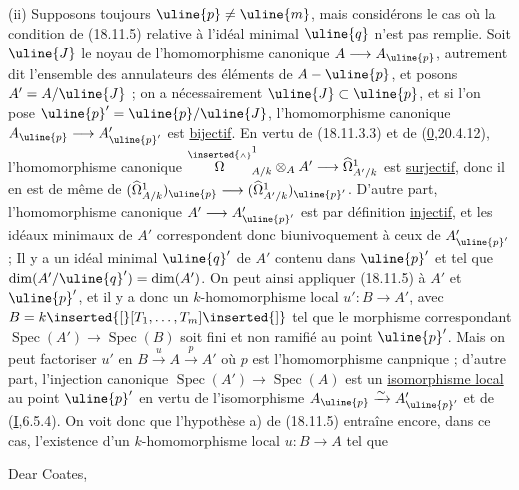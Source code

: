 (ii) Supposons toujours $\uline{p}\neq\uline{m}$, mais considérons le cas où la condition de (18.11.5) relative à  l'idéal minimal $\uline{q}$ n'est pas remplie. Soit $\uline{J}$ le noyau de l'homomorphisme canonique $A\longrightarrow A_{\uline{p}}$, autrement dit l'ensemble des annulateurs des éléments de $A-\uline{p}$, et posons $A'=A/\uline{J}$ ; on a nécessairement $\uline{J}\subset\uline{p}$, et si l'on pose $\uline{p}'=\uline{p}/\uline{J}$, l'homomorphisme canonique $A_{\uline{p}}\longrightarrow A'_{\uline{p}'}$ est \uline{bijectif}. En vertu de (18.11.3.3) et de (\uline{0},20.4.12), l'homomorphisme canonique
$\overset{\inserted{\scriptscriptstyle\wedge}}{\Omega}^1_{A/k}\otimes_A A'\longrightarrow\widehat\Omega^1_{A'/k}$ est \uline{surjectif}, donc il en est de même de $(\widehat\Omega^1_{A/k})_{\uline{p}}\longrightarrow(\widehat\Omega^1_{A'/k})_{\uline{p}'}$. D'autre part, l'homomorphisme canonique $A'\longrightarrow A'_{\uline{p}'}$ est par définition \uline{injectif}, et les idéaux  minimaux de $A'$ correspondent donc biunivoquement à ceux de $A'_{\uline{p}'}$ ;  Il y a un idéal minimal $\uline{q}'$ de $A'$  contenu dans  $\uline{p}'$ et tel que $\dim(A'/\uline{q}')=\dim(A')$. On peut ainsi appliquer (18.11.5) à $A'$ et $\uline{p}'$, et il y a donc un $k$-homomorphisme local $u':B\longrightarrow A'$, avec $B=k\inserted{[}[T_1,\ldots,T_m]\inserted{]}$ tel que le morphisme correspondant $\operatorname{Spec}(A')\longrightarrow\operatorname{Spec}(B)$ soit fini et non ramifié au point $\uline{p}'$. Mais on peut factoriser $u'$ en $B\xrightarrow{u}A\xrightarrow{p}A'$ où  $p$ est l'homomorphisme canpnique ; d'autre part, l'injection canonique $\operatorname{Spec}(A')\longrightarrow\operatorname{Spec}(A)$ est un  \uline{isomorphisme local} au point $\uline{p}'$ en vertu de l'isomorphisme $A_{\uline{p}}\xrightarrow{\sim}A'_{\uline{p}'}$ et de (\uline{I},6.5.4). On voit donc que l'hypothèse a) de (18.11.5) entraîne encore, dans ce cas, l'existence d'un $k$-homomorphisme local $u:B\longrightarrow A$ tel que


Dear Coates,

